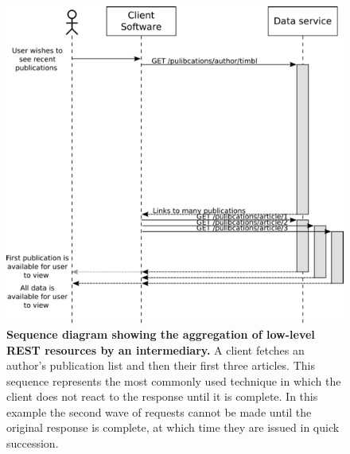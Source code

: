 \documentclass[12pt, ]{article}
\makeatletter
\def\maxwidth{\ifdim\Gin@nat@width>\linewidth\linewidth
\else\Gin@nat@width\fi}
\let\Oldincludegraphics\includegraphics
\renewcommand{\includegraphics}[1]{\Oldincludegraphics[width=\maxwidth]{#1}}
\makeatother
\begin{document}
\begin{figure}[htbp]
\centering
\includegraphics{images/rest_timeline_1.png}
\caption{\textbf{Sequence diagram showing the aggregation of low-level
REST resources by an intermediary.} A client fetches an author's
publication list and then their first three articles. This sequence
represents the most commonly used technique in which the client does not
react to the response until it is complete. In this example the second
wave of requests cannot be made until the original response is complete,
at which time they are issued in quick succession.
\label{rest_timeline_1}}
\end{figure}
\end{document}
